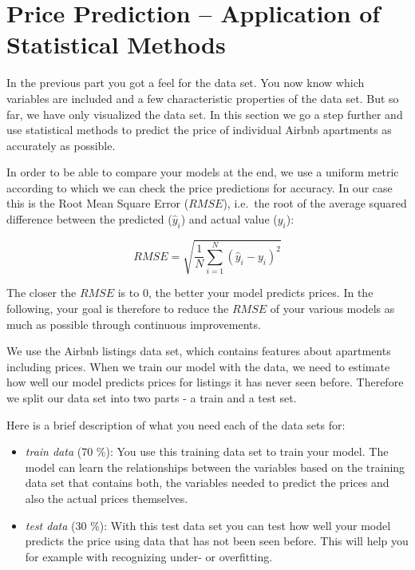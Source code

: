 \documentclass[
  11pt,
]{article}
\begin{document}
\newpage

\hypertarget{price-prediction-application-of-statistical-methods}{%
\section{Price Prediction -- Application of Statistical Methods}\label{price-prediction-application-of-statistical-methods}}

In the previous part you got a feel for the data set. You now know which variables are included and a few characteristic properties of the data set. But so far, we have only visualized the data set. In this section we go a step further and use statistical methods to predict the price of individual Airbnb apartments as accurately as possible.

In order to be able to compare your models at the end, we use a uniform metric according to which we can check the price predictions for accuracy. In our case this is the Root Mean Square Error (\(RMSE\)), i.e.~the root of the average squared difference between the predicted (\(\hat{y}_i\)) and actual value (\(y_i\)):

\[ RMSE = \sqrt{\frac{1}{N}\sum_{i=1}^{N}{(\hat{y}_i-y_i)^2}} \]

The closer the \(RMSE\) is to 0, the better your model predicts prices. In the following, your goal is therefore to reduce the \(RMSE\) of your various models as much as possible through continuous improvements.

We use the Airbnb listings data set, which contains features about apartments including prices. When we train our model with the data, we need to estimate how well our model predicts prices for listings it has never seen before. Therefore we split our data set into two parts - a train and a test set.

Here is a brief description of what you need each of the data sets for:

\begin{itemize}
\item
  \emph{train data} (70 \%): You use this training data set to train your model. The model can learn the relationships between the variables based on the training data set that contains both, the variables needed to predict the prices and also the actual prices themselves.
\item
  \emph{test data} (30 \%): With this test data set you can test how well your model predicts the price using data that has not been seen before. This will help you for example with recognizing under- or overfitting.
\end{itemize}
\end{document}
